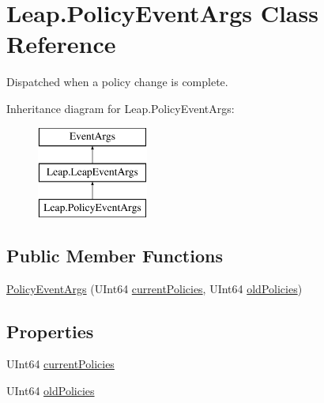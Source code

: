\hypertarget{class_leap_1_1_policy_event_args}{}\section{Leap.\+Policy\+Event\+Args Class Reference}
\label{class_leap_1_1_policy_event_args}


Dispatched when a policy change is complete.  


Inheritance diagram for Leap.\+Policy\+Event\+Args\+:\begin{figure}[H]
\begin{center}
\leavevmode
\includegraphics[height=3.000000cm]{class_leap_1_1_policy_event_args}
\end{center}
\end{figure}
\subsection*{Public Member Functions}
\begin{DoxyCompactItemize}
\item 
\mbox{\hyperlink{class_leap_1_1_policy_event_args_a89b959aba17fa53af3df25a37a2bdab8}{Policy\+Event\+Args}} (U\+Int64 \mbox{\hyperlink{class_leap_1_1_policy_event_args_add9ddda6113e7f8fd96b0961cac32815}{current\+Policies}}, U\+Int64 \mbox{\hyperlink{class_leap_1_1_policy_event_args_a3a0e12d8a1869a57be143d7a8fbd74bd}{old\+Policies}})
\end{DoxyCompactItemize}
\subsection*{Properties}
\begin{DoxyCompactItemize}
\item 
U\+Int64 \mbox{\hyperlink{class_leap_1_1_policy_event_args_add9ddda6113e7f8fd96b0961cac32815}{current\+Policies}}
\item 
U\+Int64 \mbox{\hyperlink{class_leap_1_1_policy_event_args_a3a0e12d8a1869a57be143d7a8fbd74bd}{old\+Policies}}
\end{DoxyCompactItemize}


